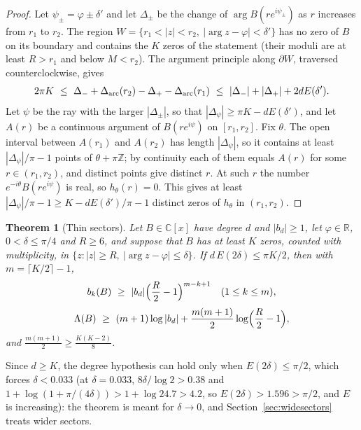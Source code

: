 \documentclass[11pt]{article}
\newtheorem{theorem}{Theorem}[section]
\newcommand{\R}{\mathbb R}
\begin{document}
\begin{proof}
Let $\psi_\pm=\varphi\pm\delta'$ and let $\Delta_\pm$ be the change of
$\arg B(re^{i\psi_\pm})$ as $r$ increases from $r_1$ to $r_2$.  The region
$W=\{r_1<|z|<r_2,\ |\arg z-\varphi|<\delta'\}$ has no zero of $B$ on its
boundary and contains the $K$ zeros of the statement (their moduli are at
least $R>r_1$ and below $M<r_2$).  The argument principle along
$\partial W$, traversed counterclockwise, gives
\[
  2\pi K\ \le\ \Delta_-+\Delta_{\rm arc}(r_2)-\Delta_+-\Delta_{\rm arc}(r_1)
  \ \le\ |\Delta_-|+|\Delta_+|+2dE(\delta').
\]
Let $\psi$ be the ray with the larger $|\Delta_\pm|$, so that
$|\Delta_\psi|\ge\pi K-dE(\delta')$, and let $A(r)$ be a continuous argument of
$B(re^{i\psi})$ on $[r_1,r_2]$.  Fix $\theta$.  The open interval between
$A(r_1)$ and $A(r_2)$ has length $|\Delta_\psi|$, so it contains at least
$|\Delta_\psi|/\pi-1$ points of $\theta+\pi\mathbb Z$; by continuity each of
them equals $A(r)$ for some $r\in(r_1,r_2)$, and distinct points give distinct
$r$.  At such $r$ the number $e^{-i\theta}B(re^{i\psi})$ is real, so
$h_\theta(r)=0$.  This gives at least $|\Delta_\psi|/\pi-1\ge K-dE(\delta')/\pi-1$
distinct zeros of $h_\theta$ in $(r_1,r_2)$.
\end{proof}

\begin{theorem}[Thin sectors]\label{thm:thinsector}
Let $B\in\mathbb C[x]$ have degree $d$ and $|b_d|\ge1$, let $\varphi\in\R$,
$0<\delta\le\pi/4$ and $R\ge6$, and suppose that $B$ has at least $K$ zeros,
counted with multiplicity, in $\{z:|z|\ge R,\ |\arg z-\varphi|\le\delta\}$.  If
$d\,E(2\delta)\le\pi K/2$, then with $m=\lceil K/2\rceil-1$,
\[
  b_k(B)\ \ge\ |b_d|\Bigl(\frac R2-1\Bigr)^{m-k+1}\quad(1\le k\le m),
\]
\[
  \Lambda(B)\ \ge\ (m+1)\log|b_d|+\frac{m(m+1)}2\log\Bigl(\frac R2-1\Bigr),
\]
and $\frac{m(m+1)}2\ge\frac{K(K-2)}8$.
\end{theorem}

Since $d\ge K$, the degree hypothesis can hold only when
$E(2\delta)\le\pi/2$, which forces $\delta<0.033$ (at $\delta=0.033$,
$8\delta/\log2>0.38$ and $1+\log(1+\pi/(4\delta))>1+\log24.7>4.2$, so
$E(2\delta)>1.596>\pi/2$, and $E$ is increasing): the theorem is meant for
$\delta\to0$, and Section~\ref{sec:widesectors} treats wider sectors.
\end{document}
